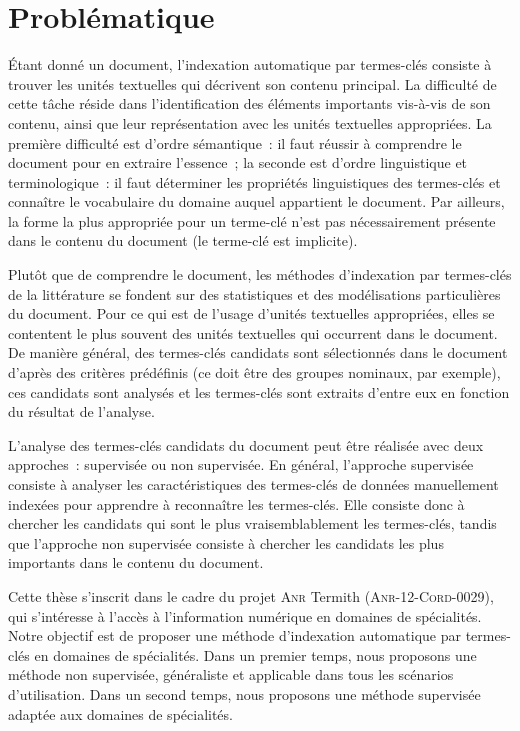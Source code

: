 
  \section{Problématique}
  \label{sec:main-introduction-problem_statement}
    Étant donné un document, l'indexation automatique par termes-clés consiste à
    trouver les unités textuelles qui décrivent son contenu principal. La
    difficulté de cette tâche réside dans l'identification des éléments
    importants vis-à-vis de son contenu, ainsi que leur représentation avec les
    unités textuelles appropriées. La première difficulté est d'ordre
    sémantique~: il faut réussir à comprendre le document pour en extraire
    l'essence~; la seconde est d'ordre linguistique et terminologique~: il faut
    déterminer les propriétés linguistiques des termes-clés et connaître le
    vocabulaire du domaine auquel appartient le document. Par ailleurs, la forme
    la plus appropriée pour un terme-clé n'est pas nécessairement présente
    dans le contenu du document (le terme-clé est implicite).

    Plutôt que de comprendre le document, les méthodes d'indexation par
    termes-clés de la littérature se fondent sur des statistiques et
    des modélisations particulières du document. Pour ce qui est de l'usage
    d'unités textuelles appropriées, elles se contentent le plus souvent des
    unités textuelles qui occurrent dans le document. De manière général, des
    termes-clés candidats sont sélectionnés dans le document d'après des
    critères prédéfinis (ce doit être des groupes nominaux, par exemple), ces
    candidats sont analysés et les termes-clés sont extraits d'entre eux en
    fonction du résultat de l'analyse.

    L'analyse des termes-clés candidats du document peut être réalisée avec deux
    approches~: supervisée ou non supervisée. En général, l'approche supervisée
    consiste à analyser les caractéristiques des termes-clés de données
    manuellement indexées pour apprendre à reconnaître les termes-clés. Elle
    consiste donc à chercher les candidats qui sont le plus vraisemblablement
    les termes-clés, tandis que l'approche non supervisée consiste à chercher
    les candidats les plus importants dans le contenu du document.

    Cette thèse s'inscrit dans le cadre du projet \textsc{Anr} Termith
    (\textsc{Anr-12-Cord-0029}), qui s'intéresse à l'accès à l'information
    numérique en domaines de spécialités. Notre objectif est de proposer une
    méthode d'indexation automatique par termes-clés en domaines de spécialités.
    Dans un premier temps, nous proposons une méthode non supervisée,
    généraliste et applicable dans tous les scénarios d'utilisation. Dans un
    second temps, nous proposons une méthode supervisée adaptée aux domaines de
    spécialités.

